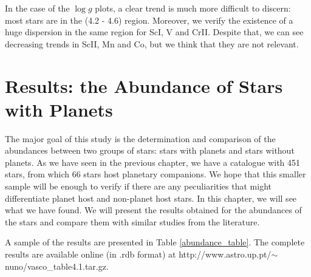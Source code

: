 \documentclass[dvips,12pt,a4paper]{report}
\begin{document}
{{In the case of the $\log g$ plots, a clear trend is much more difficult to discern: most stars are in the (4.2 - 4.6) region. Moreover, we verify the existence of a huge dispersion in the same region for ScI, V and CrII. Despite that, we can see decreasing trends in ScII, Mn and Co, but we think that they are not relevant.


\chapter{Results: the Abundance of Stars with Planets}


The major goal of this study is the determination and comparison of the abundances between two groups of stars: stars with planets and stars without planets. As we have seen in the previous chapter, we have a catalogue with 451 stars, from which 66 stars host planetary companions. We hope that this smaller sample will be enough to verify if there are any peculiarities that might differentiate planet host and non-planet host stars. In this chapter, we will see what we have found. We will present the results obtained for the abundances of the stars and compare them with similar studies from the literature.

A sample of the results are presented in Table \ref{abundance_table}. The complete results are available online (in .rdb format) at http://www.astro.up.pt/$\sim$nuno/vasco\_table4.1.tar.gz.


}}
\end{document}
